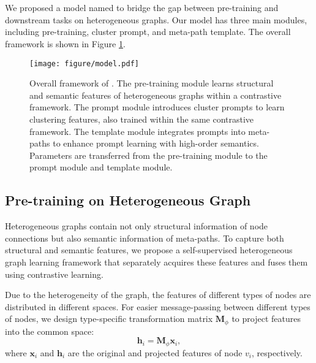 \section{\ourmethod}

We proposed a model named \ourmethod to bridge the gap between pre-training and downstream tasks on heterogeneous graphs. Our model has three main modules, including pre-training, cluster prompt, and meta-path template. The overall framework is shown in Figure \ref{figure::framework}.

\begin{figure}
	\centering
	\texttt{[image: figure/model.pdf]}
	\caption{Overall framework of \ourmethod. The pre-training module learns structural and semantic features of heterogeneous graphs within a contrastive framework. The prompt module introduces cluster prompts to learn clustering features, also trained within the same contrastive framework. The template module integrates prompts into meta-paths to enhance prompt learning with high-order semantics. Parameters are transferred from the pre-training module to the prompt module and template module.}
	\label{figure::framework}
\end{figure}

\subsection{Pre-training on Heterogeneous Graph}\label{sec::pretrain}

Heterogeneous graphs contain not only structural information of node connections but also semantic information of meta-paths. To capture both structural and semantic features, we propose a self-supervised heterogeneous graph learning framework that separately acquires these features and fuses them using contrastive learning.

Due to the heterogeneity of the graph, the features of different types of nodes are distributed in different spaces. For easier message-passing between different types of nodes, we design type-specific transformation matrix $\bm M_{\phi}$ to project features into the common space:
\begin{equation}\label{equ::transformation}
    \bm h_i = \bm M_\phi \bm x_i,
\end{equation}
where $\bm x_i$ and $\bm h_i$ are the original and projected features of node $v_i$, respectively.

